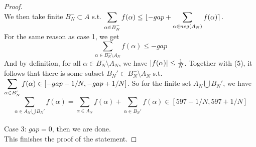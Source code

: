\documentclass[lang=cn,11pt]{elegantbook}
\begin{document}
\begin{proof}
\\ We then take finite $B_N^- \subset A$ s.t. $\displaystyle \sum_{\alpha \in B_N^-} f(\alpha) \leq \lfloor -gap + \sum_{\alpha \in neg(A_N)} f(\alpha) \rceil$.\\
For the same reason as case 1, we get 
\begin{equation}
     \sum_{\alpha \in B_N^- \setminus A_N} f(\alpha) \leq -gap 
\end{equation}
And by definition, for all $\alpha \in B_N^- \setminus A_N$, we have $|f(\alpha)|\leq {1\over N}$. Together with (5), it follows that there is some subset $B_N' \subset B_N^- \setminus A_N$ s.t. $\displaystyle \sum_{\alpha \in B_N'} f(\alpha) \in [-gap-1/N, -gap+1/N]$. So for the finite set $A_N \bigcup B_N'$, we have 
\begin{equation}
    \sum_{\alpha \in A_N \bigcup B_N'}f(\alpha) = \sum_{\alpha \in A_N}f(\alpha) + \sum_{\alpha \in  B_N'}f(\alpha) \in [597-1/N, 597+1/N]
\end{equation}\\
Case 3: $gap = 0$, then we are done.\\
This finishes the proof of the statement.
\end{proof}
\end{document}
